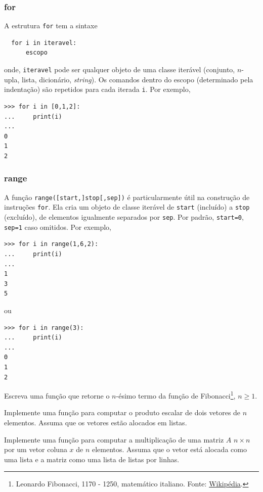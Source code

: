 \documentclass[12pt]{article}
\begin{document}
\subsubsection{for}

A estrutura \lstinline+for+ tem a sintaxe
\begin{lstlisting}
  for i in iteravel:
      escopo
\end{lstlisting}
onde, \lstinline+iteravel+ pode ser qualquer objeto de uma classe iterável (conjunto, $n$-upla, lista, dicionário, {\it string}). Os comandos dentro do escopo (determinado pela indentação) são repetidos para cada iterada \lstinline+i+. Por exemplo,
\begin{lstlisting}
>>> for i in [0,1,2]:
...     print(i)
... 
0
1
2
\end{lstlisting}

\subsubsection{range}

A função {\python} \lstinline+range([start,]stop[,sep])+ é particularmente útil na construção de instruções \lstinline+for+. Ela cria um objeto de classe iterável de \lstinline+start+ (incluído) a \lstinline+stop+ (excluído), de elementos igualmente separados por \lstinline+sep+. Por padrão, \lstinline+start=0+, \lstinline+sep=1+ caso omitidos. Por exemplo,
\begin{lstlisting}
>>> for i in range(1,6,2):
...     print(i)
... 
1
3
5
\end{lstlisting}
ou
\begin{lstlisting}
>>> for i in range(3):
...     print(i)
... 
0
1
2
\end{lstlisting}

\begin{exr}
  Escreva uma função que retorne o $n$-ésimo termo da função de Fibonacci\footnote{Leonardo Fibonacci, 1170 - 1250, matemático italiano. Fonte: \href{https://pt.wikipedia.org/wiki/Leonardo\_Fibonacci}{Wikipédia}.}, $n\geq 1$. 
\end{exr}

\begin{exr}
  Implemente uma função para computar o produto escalar de dois vetores de $n$ elementos. Assuma que os vetores estão alocados em listas.
\end{exr}

\begin{exr}
  Implemente uma função para computar a multiplicação de uma matriz $A$ $n\times n$ por um vetor coluna $x$ de $n$ elementos. Assuma que o vetor está alocada como uma lista e a matriz como uma lista de listas por linhas.
\end{exr}
\end{document}
